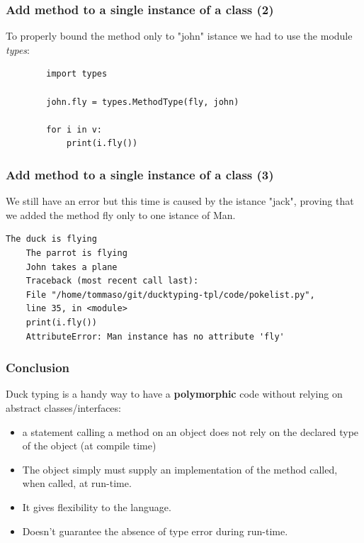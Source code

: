 \documentclass[xcolor ={table,usenames,dvipsnames}]{beamer}
\theoremstyle{definition}
\begin{document}
	\begin{frame}[fragile]
		\frametitle{Add method to a single instance of a class (2)}
			
		To properly bound the method only to "john" istance we had to use the module \textit{types}:
		
		\begin{lstlisting}
		import types
		
		john.fly = types.MethodType(fly, john)
		
		for i in v:
			print(i.fly())
		\end{lstlisting}
	\end{frame}

	\begin{frame}[fragile]
		\frametitle{Add method to a single instance of a class (3)}
			We still have an error but this time is caused by the istance "jack", proving that we added the method fly only to one istance of Man. 
		
		\begin{lstlisting}[keywordstyle=\color{black},
		commentstyle=\color{black},
		stringstyle=\color{black}.]
	The duck is flying
	The parrot is flying
	John takes a plane
	Traceback (most recent call last):
	File "/home/tommaso/git/ducktyping-tpl/code/pokelist.py",
	line 35, in <module>
	print(i.fly())
	AttributeError: Man instance has no attribute 'fly'
		\end{lstlisting}
	\end{frame}

\begin{frame}
	\frametitle{Conclusion}
	Duck typing is a handy way to have a \textbf{polymorphic} code without relying on abstract classes/interfaces:
	\begin{itemize}
		\item a statement calling a method on an object does not rely on the declared type of the object (at compile time)
		\item The object simply must supply an implementation of the method called, when called, at run-time. 
		\item It gives flexibility to the language.
		\item Doesn't guarantee the absence of type error during run-time.
	\end{itemize}
\end{frame}
\end{document}
